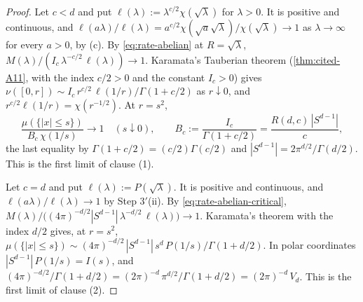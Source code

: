 \begin{proof}
Let $c < d$ and put $\ell(\lambda) := \lambda^{c/2}\chi(\sqrt\lambda)$ for $\lambda > 0$. It is
positive and continuous, and
$\ell(a\lambda)/\ell(\lambda) = a^{c/2}\chi(\sqrt a\sqrt\lambda)/\chi(\sqrt\lambda) \to 1$ as
$\lambda \to \infty$ for every $a > 0$, by (c). By \ref{eq:rate-abelian} at $R = \sqrt\lambda$,
$M(\lambda)/(I_c\,\lambda^{-c/2}\,\ell(\lambda)) \to 1$. Karamata's Tauberian theorem
(\ref{thm:cited-A11}, with the index $c/2 > 0$ and the constant $I_c > 0$) gives
$\nu([0,r]) \sim I_c\,r^{c/2}\,\ell(1/r)/\Gamma(1 + c/2)$ as $r \downarrow 0$, and
$r^{c/2}\ell(1/r) = \chi(r^{-1/2})$. At $r = s^2$,
\begin{equation}\label{eq:rate-ball}
  \frac{\mu(\{|x| \le s\})}{B_c\,\chi(1/s)} \to 1 \quad (s \downarrow 0),
  \qquad B_c := \frac{I_c}{\Gamma(1 + c/2)} = \frac{R(d,c)\,|S^{d-1}|}{c} ,
\end{equation}
the last equality by $\Gamma(1 + c/2) = (c/2)\Gamma(c/2)$ and $|S^{d-1}| = 2\pi^{d/2}/\Gamma(d/2)$.
This is the first limit of clause (1).

Let $c = d$ and put $\ell(\lambda) := P(\sqrt\lambda)$. It is positive and continuous, and
$\ell(a\lambda)/\ell(\lambda) \to 1$ by Step 3$'$(ii). By \ref{eq:rate-abelian-critical},
$M(\lambda)/\bigl((4\pi)^{-d/2}|S^{d-1}|\,\lambda^{-d/2}\,\ell(\lambda)\bigr) \to 1$. Karamata's
theorem with the index $d/2$ gives, at $r = s^2$,
$\mu(\{|x| \le s\}) \sim (4\pi)^{-d/2}\,|S^{d-1}|\,s^{d}\,P(1/s)/\Gamma(1 + d/2)$. In polar
coordinates $|S^{d-1}|\,P(1/s) = I(s)$, and
$(4\pi)^{-d/2}/\Gamma(1 + d/2) = (2\pi)^{-d}\,\pi^{d/2}/\Gamma(1 + d/2) = (2\pi)^{-d}\,V_d$. This is
the first limit of clause (2).


\end{proof}
